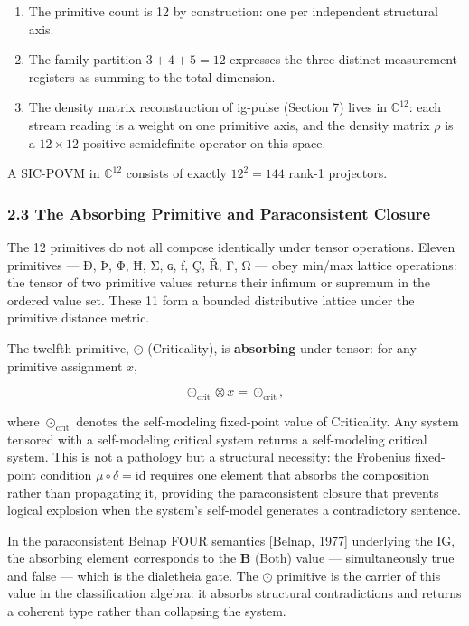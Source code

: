 \begin{enumerate}
\def\labelenumi{\arabic{enumi}.}
\tightlist
\item
  The primitive count is 12 by construction: one per independent
  structural axis.
\item
  The family partition \(3 + 4 + 5 = 12\) expresses the three distinct
  measurement registers as summing to the total dimension.
\item
  The density matrix reconstruction of ig-pulse (Section 7) lives in
  \(\mathbb{C}^{12}\): each stream reading is a weight on one primitive
  axis, and the density matrix \(\rho\) is a \(12 \times 12\) positive
  semidefinite operator on this space.
\end{enumerate}

A SIC-POVM in \(\mathbb{C}^{12}\) consists of exactly \(12^2 = 144\)
rank-1 projectors.

\hypertarget{the-absorbing-primitive-and-paraconsistent-closure}{%
\subsubsection{2.3 The Absorbing Primitive and Paraconsistent
Closure}\label{the-absorbing-primitive-and-paraconsistent-closure}}

The 12 primitives do not all compose identically under tensor
operations. Eleven primitives --- Ð, Þ, Φ, Ħ, Σ, ɢ, ƒ, Ç, Ř, Γ, Ω ---
obey min/max lattice operations: the tensor of two primitive values
returns their infimum or supremum in the ordered value set. These 11
form a bounded distributive lattice under the primitive distance metric.

The twelfth primitive, \(\odot\) (Criticality), is \textbf{absorbing}
under tensor: for any primitive assignment \(x\),

\[\odot_{\mathrm{crit}} \otimes x = \odot_{\mathrm{crit}},\]

where \(\odot_{\mathrm{crit}}\) denotes the self-modeling fixed-point
value of Criticality. Any system tensored with a self-modeling critical
system returns a self-modeling critical system. This is not a pathology
but a structural necessity: the Frobenius fixed-point condition
\(\mu \circ \delta = \mathrm{id}\) requires one element that absorbs the
composition rather than propagating it, providing the paraconsistent
closure that prevents logical explosion when the system's self-model
generates a contradictory sentence.

In the paraconsistent Belnap FOUR semantics {[}Belnap, 1977{]}
underlying the IG, the absorbing element corresponds to the
\(\mathbf{B}\) (Both) value --- simultaneously true and false --- which
is the dialetheia gate. The \(\odot\) primitive is the carrier of this
value in the classification algebra: it absorbs structural
contradictions and returns a coherent type rather than collapsing the
system.

